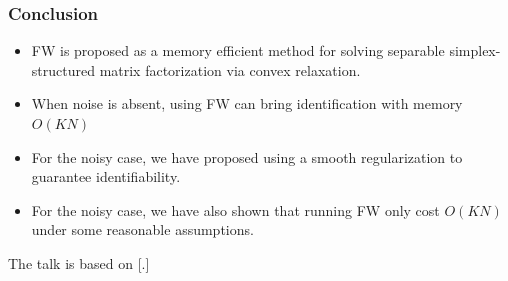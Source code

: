 \documentclass[10pt,xcolor={usenames,dvipsnames,table}]{beamer}
\def\blue{\color{blue}}
\begin{document}
\begin{frame}
    \frametitle{Conclusion}
    \begin{itemize}
        \item FW is proposed as a memory efficient method for solving separable simplex-structured matrix factorization via convex relaxation.
        \item When noise is absent, using FW can bring identification with memory $O(KN)$
        \item For the noisy case, we have proposed using a smooth regularization to guarantee identifiability.
        \item For the noisy case, we have also shown that running FW only cost $O(KN)$ under some reasonable assumptions.

    \end{itemize}

    The talk is based on {\scriptsize [.]}
\end{frame}
\end{document}
